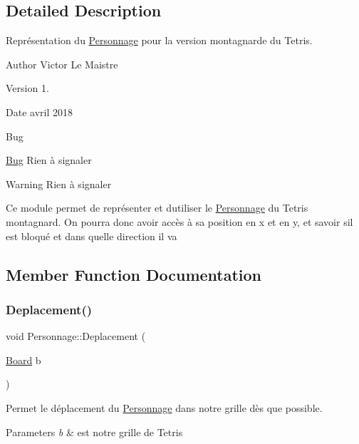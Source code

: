 \subsection{Detailed Description}
Représentation du \hyperlink{classPersonnage}{Personnage} pour la version montagnarde du Tetris. 

\begin{DoxyAuthor}{Author}
Victor Le Maistre 
\end{DoxyAuthor}
\begin{DoxyVersion}{Version}
1. 
\end{DoxyVersion}
\begin{DoxyDate}{Date}
avril 2018 
\end{DoxyDate}
\begin{DoxyRefDesc}{Bug}
\item[\hyperlink{bug__bug000007}{Bug}]Rien à signaler \end{DoxyRefDesc}
\begin{DoxyWarning}{Warning}
Rien à signaler
\end{DoxyWarning}
Ce module permet de représenter et d\textquotesingle{}utiliser le \hyperlink{classPersonnage}{Personnage} du Tetris montagnard. On pourra donc avoir accès à sa position en x et en y, et savoir s\textquotesingle{}il est bloqué et dans quelle direction il va 

\subsection{Member Function Documentation}
\mbox{\label{classPersonnage_a3248e00e7413b2a97a7f198475318d6b}} 
\subsubsection{\texorpdfstring{Deplacement()}{Deplacement()}}
{\footnotesize\ttfamily void Personnage\+::\+Deplacement (\begin{DoxyParamCaption}\item[{\hyperlink{classBoard}{Board}}]{b }\end{DoxyParamCaption})}



Permet le déplacement du \hyperlink{classPersonnage}{Personnage} dans notre grille dès que possible. 


\begin{DoxyParams}{Parameters}
{\em b} & est notre grille de Tetris \\
\hline
\end{DoxyParams}
\mbox{\label{classPersonnage_a4d5855ca459563583026c13072b72577}} 
